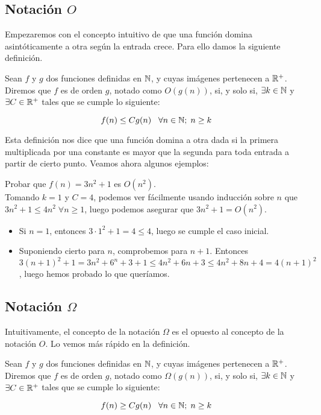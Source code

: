 \subsection{Notación $O$}

Empezaremos con el concepto intuitivo de que una función domina asintóticamente a otra según la entrada crece. Para ello damos la siguiente definición.

\begin{definicion}
	Sean $f$ y $g$ dos funciones definidas en $\mathbb{N}$, y cuyas imágenes pertenecen a $\mathbb{R}^+$. Diremos que $f$ es de orden $g$, notado como $O(g(n))$, si, y solo si, $\exists k \in \mathbb{N}$ y $\exists C \in \mathbb{R}^+$ tales que se cumple lo siguiente:
	
	$$f(n) \leq Cg(n) \;\;\;\forall n \in \mathbb{N};\; n \geq k$$
\end{definicion}

Esta definición nos dice que una función domina a otra dada si la primera multiplicada por una constante es mayor que la segunda para toda entrada a partir de cierto punto. Veamos ahora algunos ejemplos:

\begin{ejemplo}
	Probar que $f(n) = 3n^2 + 1$ es $O(n^2)$.\\
	
	Tomando $k=1$ y $C=4$, podemos ver fácilmente usando inducción sobre $n$ que $3n^2 + 1 \leq 4n^2\;\forall n \geq 1$, luego podemos asegurar que $3n^2 + 1 = O(n^2)$.\\
	
	\begin{itemize}
		\item Si $n=1$, entonces $3 \cdot 1^2 + 1 = 4 \leq 4$, luego se cumple el caso inicial.
		\item Suponiendo cierto para $n$, comprobemos para $n + 1$. Entonces $3(n+1)^2 + 1 = 3n^2 + 6^n + 3 + 1 \leq 4n^2 + 6n + 3 \leq 4n^2 + 8n + 4 = 4(n+1)^2$, luego hemos probado lo que queríamos.
	\end{itemize}
\end{ejemplo}

\subsection{Notación $\Omega$}

Intuitivamente, el concepto de la notación $\Omega$ es el opuesto al concepto de la notación $O$. Lo vemos más rápido en la definición.

\begin{definicion}
	Sean $f$ y $g$ dos funciones definidas en $\mathbb{N}$, y cuyas imágenes pertenecen a $\mathbb{R}^+$. Diremos que $f$ es de orden $g$, notado como $\Omega(g(n))$, si, y solo si, $\exists k \in \mathbb{N}$ y $\exists C \in \mathbb{R}^+$ tales que se cumple lo siguiente:
	
	$$f(n) \geq Cg(n) \;\;\;\forall n \in \mathbb{N};\; n \geq k$$
\end{definicion}

